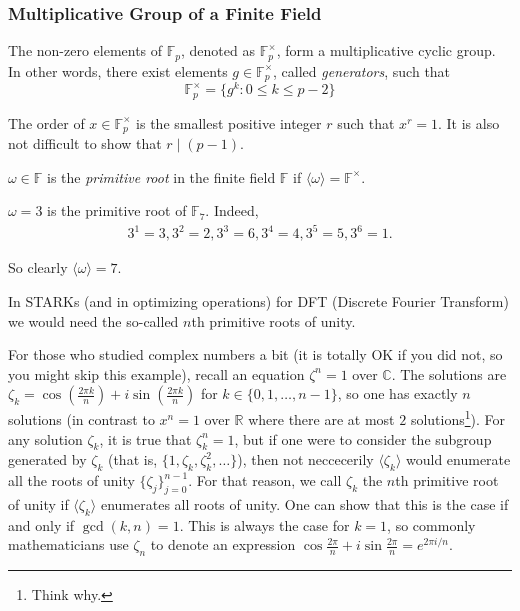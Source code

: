\documentclass[../lecture-notes.tex]{subfiles}
\begin{document}
\subsubsection{Multiplicative Group of a Finite Field}

The non-zero elements of $\mathbb{F}_p$, denoted as $\mathbb{F}_p^{\times}$, form a multiplicative cyclic group. In other words, there exist elements $g \in \mathbb{F}_p^{\times}$, called \textit{generators}, such that
\begin{equation}
    \mathbb{F}_p^{\times} = \{g^k: 0 \leq k \leq p-2\}
\end{equation}

The order of $x \in \mathbb{F}_p^{\times}$ is the smallest positive integer $r$ such that $x^r=1$. It is also not difficult to show that $r \mid (p-1)$.

\begin{definition}
    $\omega \in \mathbb{F}$ is the \textit{primitive root} in the finite field $\mathbb{F}$ if $\langle\omega\rangle = \mathbb{F}^{\times}$.
\end{definition}

\begin{example}
    $\omega=3$ is the primitive root of $\mathbb{F}_7$. Indeed,
    \begin{equation}
        \begin{aligned}
            3^1=3, 3^2=2, 3^3=6, 3^4=4, 3^5=5, 3^6=1.
        \end{aligned}
    \end{equation}

    So clearly $\langle \omega \rangle = 7$.
\end{example}

In STARKs (and in optimizing operations) for DFT (Discrete Fourier Transform) we would need the so-called $n$th primitive roots of unity.

\begin{example}
    For those who studied complex numbers a bit (it is totally OK if you did not, so you might skip this example), recall an equation $\zeta^n=1$ over $\mathbb{C}$. The solutions are $\zeta_k = \cos\left(\frac{2\pi k}{n}\right) + i\sin\left(\frac{2\pi k}{n}\right)$ for $k\in\{0,1,\dots,n-1\}$, so one has exactly $n$ solutions (in contrast to $x^n=1$ over $\mathbb{R}$ where there are at most $2$ solutions\footnote{Think why.}). For any solution $\zeta_k$, it is true that $\zeta_k^n=1$, but if one were to consider the subgroup generated by $\zeta_k$ (that is, $\{1,\zeta_k, \zeta_k^2,\dots\}$), then not neccecerily $\langle \zeta_k \rangle$ would enumerate all the roots of unity $\{\zeta_j\}_{j=0}^{n-1}$. For that reason, we call $\zeta_k$ the $n$th primitive root of unity if $\langle \zeta_k \rangle$ enumerates all roots of unity. One can show that this is the case if and only if $\gcd(k,n)=1$. This is always the case for $k=1$, so commonly mathematicians use $\zeta_n$ to denote an expression $\cos \frac{2\pi}{n} + i\sin\frac{2\pi}{n} = e^{2\pi i/n}$.
\end{example}
\end{document}
